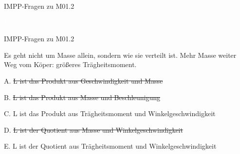 \documentclass{beamer}
\begin{document}
{  
\begin{frame}{IMPP-Fragen zu M01.2}

\textcolor{white}{Wir erinnern uns}  \\ [6cm]


\end{frame}
}





\begin{frame}{IMPP-Fragen zu M01.2}

Es geht nicht um Masse allein, sondern wie sie verteilt ist. Mehr Masse weiter Weg vom Köper: größeres Trägheitsmoment.

\pause 

\begin{description}
\item{A.} \sout{L ist das Produkt aus Geschwindigkeit und Masse}
\item{B.} \sout{L ist das Produkt aus Masse und Beschleunigung}
\item{C.} L ist das Produkt aus Trägheitsmoment und Winkelgeschwindigkeit %
\item{D.} \sout{L ist der Quotient aus Masse und Winkelgeschwindigkeit}
\item{E.}  L ist der Quotient aus Trägheitsmoment und Winkelgeschwindigkeit
\end{description}

\end{frame}
\end{document}
